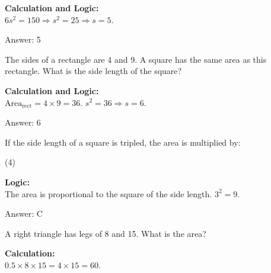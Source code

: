 \documentclass[11pt,paper=a4,answers]{exam}
\begin{document}
\begin{questions}
\begin{solution}
\textbf{Calculation and Logic:} \\
$6s^2 = 150 \Rightarrow s^2 = 25 \Rightarrow s = 5$.

\vspace{30pt}

Answer: \colorbox{yellow!100}{5}
\end{solution}

\vspace{60pt}

\question
The sides of a rectangle are 4 and 9. A square has the same area as this rectangle. What is the side length of the square?

\begin{solution}
\textbf{Calculation and Logic:} \\
$\text{Area}_{\text{rect}} = 4 \times 9 = 36$. $s^2 = 36 \Rightarrow s = 6$.

\vspace{30pt}

Answer: \colorbox{yellow!100}{6}
\end{solution}

\vspace{60pt}

\question
If the side length of a square is tripled, the area is multiplied by:
\begin{tasks}(4)
\end{tasks}

\begin{solution}
\textbf{Logic:} \\
The area is proportional to the square of the side length. $3^2 = 9$.

\vspace{30pt}

Answer: \colorbox{yellow!100}{C}
\end{solution}

\vspace{60pt}

\question
A right triangle has legs of 8 and 15. What is the area?

\begin{solution}
\textbf{Calculation:} \\
$0.5 \times 8 \times 15 = 4 \times 15 = 60$.


\end{solution}
\end{questions}
\end{document}
